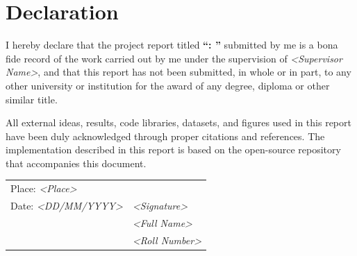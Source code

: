 \chapter*{Declaration}

I hereby declare that the project report titled \textbf{``\projname: \projtag''}
submitted by me is a bona fide record of the work carried out by me under the
supervision of \emph{\textless Supervisor Name\textgreater}, and that this
report has not been submitted, in whole or in part, to any other university
or institution for the award of any degree, diploma or other similar title.

All external ideas, results, code libraries, datasets, and figures used in
this report have been duly acknowledged through proper citations and
references. The implementation described in this report is based on the
open-source repository  that accompanies this
document.

\vspace{2cm}
\noindent
\begin{tabular}{@{}p{7.5cm}p{7.5cm}@{}}
Place: \emph{\textless Place\textgreater} & \\[0.6cm]
Date: \emph{\textless DD/MM/YYYY\textgreater} & \hfill \emph{\textless Signature\textgreater} \\[0.3cm]
 & \hfill \emph{\textless Full Name\textgreater} \\
 & \hfill \emph{\textless Roll Number\textgreater} \\
\end{tabular}
\clearpage

